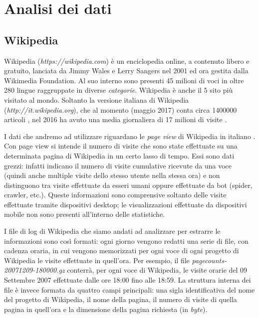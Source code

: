 \chapter{Analisi dei dati}
\bigskip

\section{Wikipedia}
\bigskip
Wikipedia (\textit{https://wikipedia.com}) è un enciclopedia online, a contenuto libero e gratuito, lanciata da Jimmy 
Wales e Lerry Sangers nel 2001 ed ora gestita dalla Wikimedia Foundation. Al suo interno sono presenti 45 milioni di voci in 
oltre 280 lingue raggruppate in diverse \textit{categorie}. Wikipedia è anche il 5 sito più visitato al mondo. Soltanto la 
versione italiana di Wikipedia (\textit{http://it.wikipedia.org}), che al momento (maggio 2017) conta circa 1400000 articoli 
\cite{wikipedia_stats}, nel 2016 ha avuto una media giornaliera di 17 milioni di visite \cite{it_wikipedia_views_2016}.
\bigskip

I dati che andremo ad utilizzare riguardano le \textit{page view} di Wikipedia in italiano \cite{wikipedia_pageviews}. Con 
page view si intende il numero di visite che sono state effettuate su una determinata pagina di Wikipedia in un certo lasso 
di tempo. Essi sono dati grezzi: infatti indicano il numero di visite cumulative ricevute da una voce (quindi anche multiple 
visite dello stesso utente nella stessa ora) e non distinguono tra visite effettuate da esseri umani oppure effettuate da bot 
(spider, crawler, etc.). Queste informazioni sono comprensive soltanto delle visite effettuate tramite dispositivi desktop; 
le visualizzazioni effettuate da dispositivi mobile non sono presenti all'interno delle statistiche.
\bigskip

I file di log di Wikipedia che siamo andati ad analizzare per estrarre le informazioni sono così formati: ogni giorno vengono 
redatti una serie di file, con cadenza oraria, in cui vengono memorizzati per ogni voce di ogni progetto di Wikipedia le 
visite effettuate in quell'ora. Per esempio, il file \textit{pagecounts-20071209-180000.gz} conterrà, per ogni voce di 
Wikipedia, le visite orarie del 09 Settembre 2007 effettuate dalle ore 18:00 fino alle 18:59. La struttura interna dei file è 
invece formata da quattro campi principali: una sigla identificativa del nome del progetto di Wikipedia, il nome della 
pagina, il numero di visite di quella pagina in quell'ora e la dimensione della pagina richiesta (in \textit{byte}).
\bigskip 
  
